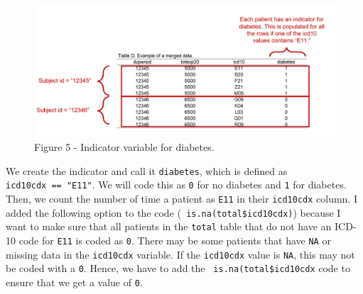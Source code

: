 \documentclass[
]{book}
\newenvironment{Shaded}{\begin{snugshade}}{\end{snugshade}}
\newcommand{\DecValTok}[1]{\textcolor[rgb]{0.00,0.00,0.81}{#1}}
\newcommand{\DocumentationTok}[1]{\textcolor[rgb]{0.56,0.35,0.01}{\textbf{\textit{#1}}}}
\newcommand{\FunctionTok}[1]{\textcolor[rgb]{0.00,0.00,0.00}{#1}}
\newcommand{\NormalTok}[1]{#1}
\newcommand{\OtherTok}[1]{\textcolor[rgb]{0.56,0.35,0.01}{#1}}
\newcommand{\SpecialCharTok}[1]{\textcolor[rgb]{0.00,0.00,0.00}{#1}}
\newcommand{\StringTok}[1]{\textcolor[rgb]{0.31,0.60,0.02}{#1}}
\theoremstyle{definition}
\theoremstyle{definition}
\theoremstyle{definition}
\theoremstyle{definition}
\theoremstyle{remark}
\begin{document}
\begin{figure}
\includegraphics[width=1\linewidth]{Figure 2_5} \caption{Figure 5 - Indicator variable for diabetes.}\label{fig:unnamed-chunk-17}
\end{figure}

We create the indicator and call it \texttt{diabetes}, which is defined as \texttt{icd10cdx\ ==\ "E11"}. We will code this as \texttt{0} for no diabetes and \texttt{1} for diabetes. Then, we count the number of time a patient as \texttt{E11} in their \texttt{icd10cdx} column. I added the following option to the code (\texttt{\textbar{}\ is.na(total\$icd10cdx)}) because I want to make sure that all patients in the \texttt{total} table that do not have an ICD-10 code for \texttt{E11} is coded as \texttt{0}. There may be some patients that have \texttt{NA} or missing data in the \texttt{icd10cdx} variable. If the \texttt{icd10cdx} value is \texttt{NA}, this may not be coded with a \texttt{0}. Hence, we have to add the \texttt{\textbar{}\ is.na(total\$icd10cdx} code to ensure that we get a value of \texttt{0}.

\begin{Shaded}
\end{Shaded}
\end{document}

